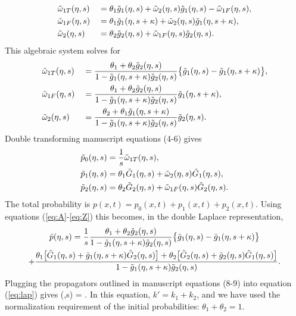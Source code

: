 \begin{alignat}{2}
	&\tilde{\omega}_{1T}(\eta,s) &&= \theta_1 \tilde{g}_1(\eta,s) + \tilde{\omega}_2(\eta,s)\tilde{g}_1(\eta,s)-\tilde{\omega}_{1F}(\eta,s),\\
	&\tilde{\omega}_{1F}(\eta,s) &&= \theta_1\tilde{g}_1(\eta,s+\kappa) + \tilde{\omega}_2(\eta,s)\tilde{g}_1(\eta,s+\kappa),\\
	&\tilde{\omega}_2(\eta,s) &&= \theta_2 \tilde{g}_2(\eta,s) + \tilde{\omega}_{1F}(\eta,s)\tilde{g}_2(\eta,s).
\end{alignat}
This algebraic system solves for 
\begin{alignat}{2}
	&\tilde{\omega}_{1T}(\eta,s) &&= \frac{\theta_1 + \theta_2 \tilde{g}_2(\eta,s)}{1-\tilde{g}_1(\eta,s+\kappa)\tilde{g}_2(\eta,s)}\big\{\tilde{g}_1(\eta,s)-\tilde{g}_1(\eta,s+\kappa) \big\}, \label{eq:A} \\
	&\tilde{\omega}_{1F}(\eta,s) &&= \frac{\theta_1 + \theta_2 \tilde{g}_2(\eta,s)}{1-\tilde{g}_1(\eta,s+\kappa)\tilde{g}_2(\eta,s)}\tilde{g}_1(\eta,s+\kappa),\\
	&\tilde{\omega}_{2}(\eta,s) &&= \frac{\theta_2 + \theta_1 \tilde{g}_1(\eta,s+\kappa)}{1-\tilde{g}_1(\eta,s+\kappa)\tilde{g}_2(\eta,s)}\tilde{g}_2(\eta,s). 
\end{alignat}
Double transforming manuscript equations (4-6) gives
\begin{align}
	\tilde{p}_0(\eta,s) &= \frac{1}{s}\tilde{\omega}_{1T}(\eta,s),\\
	\tilde{p}_1(\eta,s) &= \theta_1 \tilde{G}_1(\eta,s) + \tilde{\omega}_2(\eta,s) \tilde{G}_1(\eta,s),\\
	\tilde{p}_2(\eta,s) &= \theta_2 \tilde{G}_2(\eta,s) + \tilde{\omega}_{1F}(\eta,s)\tilde{G}_2(\eta,s).\label{eq:Z}
\end{align}
The total probability is $p(x,t) = p_0(x,t) + p_1(x,t) + p_2(x,t)$. Using equations (\ref{eq:A}-\ref{eq:Z}) this becomes, in the double Laplace representation, 
\begin{multline}
	\tilde{p}(\eta,s) = \frac{1}{s}\frac{\theta_1 + \theta_2 \tilde{g}_2(\eta,s)}{1-\tilde{g}_1(\eta,s+\kappa)\tilde{g}_2(\eta,s)}\big\{\tilde{g}_1(\eta,s)-\tilde{g}_1(\eta,s+\kappa) \big\} \\
	+\frac{\theta_1\big[\tilde{G}_1(\eta,s) + \tilde{g}_1(\eta,s+\kappa)\tilde{G}_2(\eta,s)\big]+ \theta_2\big[\tilde{G}_2(\eta,s) + \tilde{g}_2(\eta,s)\tilde{G}_1(\eta,s)\big]}{1-\tilde{g}_1(\eta,s+\kappa)\tilde{g}_2(\eta,s)}. \\
	\label{eq:lap}
\end{multline}
Plugging the propagators outlined in manuscript equations (8-9) into equation (\ref{eq:lap}) gives 
\be {}(\eta,s) = .\label{eq:nicedist}\ee
In this equation, $k'=k_1+k_2$, and we have used the normalization requirement of the initial probabilities: $\theta_1 + \theta_2 = 1.$
